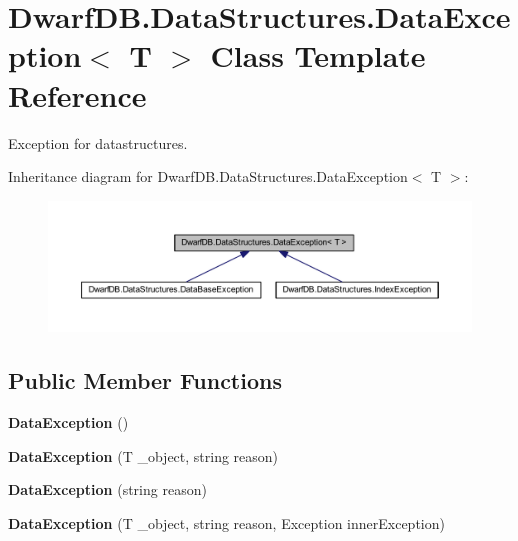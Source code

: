 \hypertarget{class_dwarf_d_b_1_1_data_structures_1_1_data_exception-g}{
\section{DwarfDB.DataStructures.DataException$<$ T $>$ Class Template Reference}
\label{class_dwarf_d_b_1_1_data_structures_1_1_data_exception-g}
}


Exception for datastructures.  




Inheritance diagram for DwarfDB.DataStructures.DataException$<$ T $>$:\nopagebreak
\begin{figure}[H]
\begin{center}
\leavevmode
\includegraphics[width=400pt]{class_dwarf_d_b_1_1_data_structures_1_1_data_exception-g__inherit__graph}
\end{center}
\end{figure}
\subsection*{Public Member Functions}
\begin{DoxyCompactItemize}
\item 
\hypertarget{class_dwarf_d_b_1_1_data_structures_1_1_data_exception-g_a55aaebcbf174a46e4172fb5f01b421b3}{
{\bfseries DataException} ()}
\label{class_dwarf_d_b_1_1_data_structures_1_1_data_exception-g_a55aaebcbf174a46e4172fb5f01b421b3}

\item 
\hypertarget{class_dwarf_d_b_1_1_data_structures_1_1_data_exception-g_af4387a96920d83cb65d7e3f16e8722e3}{
{\bfseries DataException} (T \_\-object, string reason)}
\label{class_dwarf_d_b_1_1_data_structures_1_1_data_exception-g_af4387a96920d83cb65d7e3f16e8722e3}

\item 
\hypertarget{class_dwarf_d_b_1_1_data_structures_1_1_data_exception-g_ad5c6e96cce65e0b685f01cb18e97360a}{
{\bfseries DataException} (string reason)}
\label{class_dwarf_d_b_1_1_data_structures_1_1_data_exception-g_ad5c6e96cce65e0b685f01cb18e97360a}

\item 
\hypertarget{class_dwarf_d_b_1_1_data_structures_1_1_data_exception-g_a800b1e19b9ca32978883d206a8c9683e}{
{\bfseries DataException} (T \_\-object, string reason, Exception innerException)}
\label{class_dwarf_d_b_1_1_data_structures_1_1_data_exception-g_a800b1e19b9ca32978883d206a8c9683e}

\end{DoxyCompactItemize}
